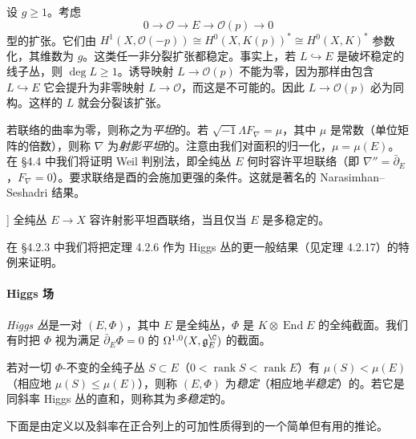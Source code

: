 \begin{example}
设 $g\ge1$。考虑
\[
0\longrightarrow\mathcal{O}\longrightarrow E\longrightarrow\mathcal{O}(p)\longrightarrow0
\]
型的扩张。它们由 $H^1(X,\mathcal{O}(-p))\cong H^0(X,K(p))^*\cong H^0(X,K)^*$ 参数化，其维数为 $g$。这类任一非分裂扩张都稳定。事实上，若 $L\hookrightarrow E$ 是破坏稳定的线子丛，则 $\deg L\ge1$。诱导映射 $L\to\mathcal{O}(p)$ 不能为零，因为那样由包含 $L\hookrightarrow E$ 它会提升为非零映射 $L\to\mathcal{O}$，而这是不可能的。因此 $L\to\mathcal{O}(p)$ 必为同构。这样的 $L$ 就会分裂该扩张。
\end{example}

若联络的曲率为零，则称之为\emph{平坦}的。若 $\sqrt{-1}\Lambda F_\nabla=\mu$，其中 $\mu$ 是常数（单位矩阵的倍数），则称 $\nabla$ 为\emph{射影平坦}的。注意由我们对面积的归一化，$\mu=\mu(E)$。在 §4.4 中我们将证明 Weil 判别法，即全纯丛 $E$ 何时容许平坦联络（即 $\nabla''=\bar\partial_E$，$F_\nabla=0$）。要求联络是酉的会施加更强的条件。这就是著名的 Narasimhan--Seshadri 结果。

\begin{theorem}[Narasimhan--Seshadri, [49]]\label{thm:4.2.6}
全纯丛 $E\to X$ 容许射影平坦酉联络，当且仅当 $E$ 是多稳定的。
\end{theorem}

在 §4.2.3 中我们将把定理 4.2.6 作为 Higgs 丛的更一般结果（见定理 4.2.17）的特例来证明。

\paragraph{Higgs 场} \emph{Higgs 丛}是一对 $(E,\Phi)$，其中 $E$ 是全纯丛，$\Phi$ 是 $K\otimes\operatorname{End}E$ 的全纯截面。我们有时把 $\Phi$ 视为满足 $\bar\partial_E\Phi=0$ 的 $\Omega^{1,0}(X,\mathfrak{g}^\C_E)$ 的截面。

\begin{definition}
若对一切 $\Phi$-不变的全纯子丛 $S\subset E$（$0<\operatorname{rank}S<\operatorname{rank}E$）有 $\mu(S)<\mu(E)$（相应地 $\mu(S)\le\mu(E)$），则称 $(E,\Phi)$ 为\emph{稳定}（相应地\emph{半稳定}）的。若它是同斜率 Higgs 丛的直和，则称其为\emph{多稳定}的。
\end{definition}

下面是由定义以及斜率在正合列上的可加性质得到的一个简单但有用的推论。
